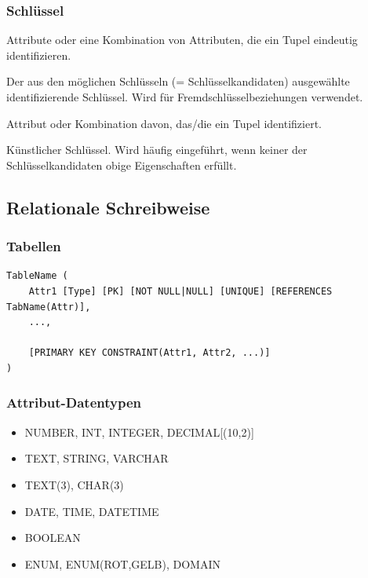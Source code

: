     \subsubsection{Schlüssel}
    \begin{description}
    \setlength{\itemsep}{0pt}    
        \item[Schlüssel] Attribute oder eine Kombination von Attributen, die ein Tupel eindeutig identifizieren.
        \item[Primärschlüssel] Der aus den möglichen Schlüsseln (= Schlüsselkandidaten) ausgewählte identifizierende Schlüssel. Wird für Fremdschlüsselbeziehungen verwendet.
        \item[Schlüsselkandidat] Attribut oder Kombination davon, das/die ein Tupel identifiziert.
        \item[Surrogatschlüssel] Künstlicher Schlüssel. Wird häufig eingeführt, wenn keiner der Schlüsselkandidaten obige Eigenschaften erfüllt.
    \end{description}
    \subsection{Relationale Schreibweise}
        \subsubsection{Tabellen}
            \begin{lstlisting}
TableName (
    Attr1 [Type] [PK] [NOT NULL|NULL] [UNIQUE] [REFERENCES TabName(Attr)],
    ...,
    
    [PRIMARY KEY CONSTRAINT(Attr1, Attr2, ...)]
)
            \end{lstlisting}
            \subsubsection{Attribut-Datentypen}
                \begin{itemize}
                \setlength{\itemsep}{0pt}  
                  \item NUMBER, INT, INTEGER, DECIMAL[(10,2)]
                  \item TEXT, STRING, VARCHAR
                  \item TEXT(3), CHAR(3)
                  \item DATE, TIME, DATETIME
                  \item BOOLEAN
                  \item ENUM, ENUM(ROT,GELB), DOMAIN
                \end{itemize}
